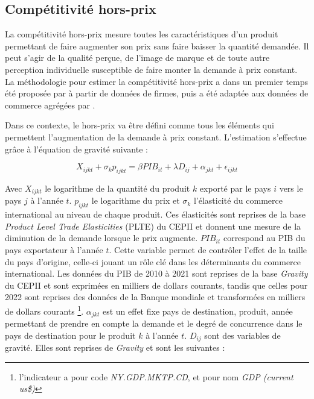 \documentclass[french,10pt,a4paper]{article}
\begin{document}
\subsection*{Compétitivité hors-prix}

La compétitivité hors-prix mesure toutes les caractéristiques d'un produit permettant de faire augmenter son prix sans faire baisser la quantité demandée. Il peut s'agir de la qualité perçue, de l'image de marque et de toute autre perception individuelle susceptible de faire monter la demande à prix constant. La méthodologie pour estimer la compétitivité hors-prix a dans un premier temps été proposée par \cite{Khandelwal2013} à partir de données de firmes, puis a été adaptée aux données de commerce agrégées par \cite{Bas2015}.

Dans ce contexte, le hors-prix va être défini comme tous les éléments qui permettent l'augmentation de la demande à prix constant. L'estimation s'effectue grâce à l'équation de gravité suivante :

\begin{equation}
\label{eq:2}
X_{ijkt} + \sigma_{k} p_{ijkt}  = \beta PIB_{it} + \lambda D_{ij} + \alpha_{jkt} + \epsilon_{ijkt}
\end{equation}

Avec $X_{ijkt}$ le logarithme de la quantité du produit $k$ exporté par le pays $i$ vers le pays $j$ à l'année $t$. $p_{ijkt}$ le logarithme du prix et $\sigma_{k}$ l'élasticité du commerce international au niveau de chaque produit. Ces élasticités sont reprises de la base \textit{Product Level Trade Elasticities} (PLTE) du CEPII \citep{Fontagne2019} et donnent une mesure de la diminution de la demande lorsque le prix augmente. $PIB_{it}$ correspond au PIB du pays exportateur à l'année $t$. Cette variable permet de contrôler l'effet de la taille du pays d'origine, celle-ci jouant un rôle clé dans les déterminants du commerce international. Les données du PIB de 2010 à 2021 sont reprises de la base \textit{Gravity} du CEPII \citep{Conte2022} et sont exprimées en milliers de dollars courants, tandis que celles pour 2022 sont reprises des données de la Banque mondiale et transformées en milliers de dollars courants \footnote{l'indicateur a pour code \textit{NY.GDP.MKTP.CD}, et pour nom \textit{GDP (current us\$)}}. $\alpha_{jkt}$ est un effet fixe pays de destination, produit, année permettant de prendre en compte la demande et le degré de concurrence dans le pays de destination pour le produit $k$ à l'année $t$. $D_{ij}$ sont des variables de gravité. Elles sont reprises de \textit{Gravity} et sont les suivantes :
\end{document}
